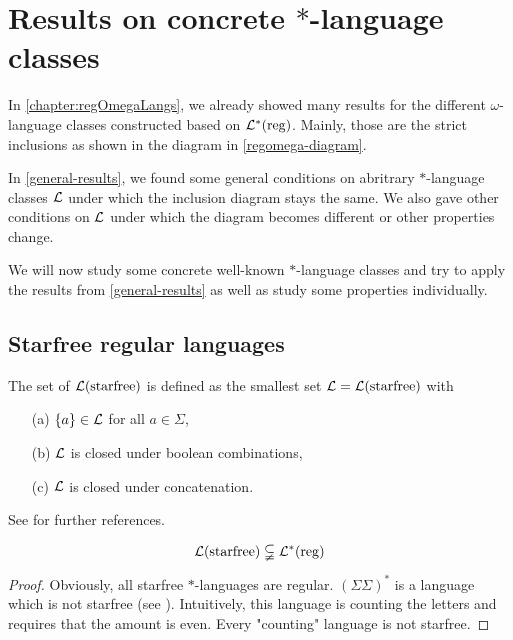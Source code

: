 \section{Results on concrete $*$-language classes}
\label{concrete-results}

In \cref{chapter:regOmegaLangs}, we already showed many results for the different $\omega$-language classes constructed based on $\mathcal{L}^*(\textup{\textrm{reg}})$. Mainly, those are the strict inclusions as shown in the diagram in \cref{regomega-diagram}.

In \cref{general-results}, we found some general conditions on abritrary $*$-language classes $\mathcal{L}$ under which the inclusion diagram stays the same. We also gave other conditions on $\mathcal{L}$ under which the diagram becomes different or other properties change.

We will now study some concrete well-known $*$-language classes and try to apply the results from \cref{general-results} as well as study some properties individually.



\subsection{Starfree regular languages}
\label{lang:starfree}
The set of  $\mathcal{L}(\textup{\textrm{starfree}})$ is defined as the smallest set $\mathcal{L} = \mathcal{L}(\textup{\textrm{starfree}})$ with
\begin{itemize}
\item[(a)] $\Set{a} \in \Lang$ for all $a \in \Sigma$,
\item[(b)] $\mathcal{L}$ is closed under boolean combinations,
\item[(c)] $\mathcal{L}$ is closed under concatenation.
\end{itemize}
See \cite[Section 2.2]{ConcHierR104} for further references.

\begin{lemma}
\[ \mathcal{L}(\textup{\textrm{starfree}}) \subsetneqq \mathcal{L}^*(\textup{\textrm{reg}}) \]
\begin{proof}
Obviously, all starfree $*$-languages are regular. $(\Sigma\Sigma)^*$ is a language which is not starfree (see \cite[IV.2.1]{FinAutLogR109}). Intuitively, this language is counting the letters and requires that the amount is even. Every "counting" language is not starfree.
\end{proof}
\end{lemma}

